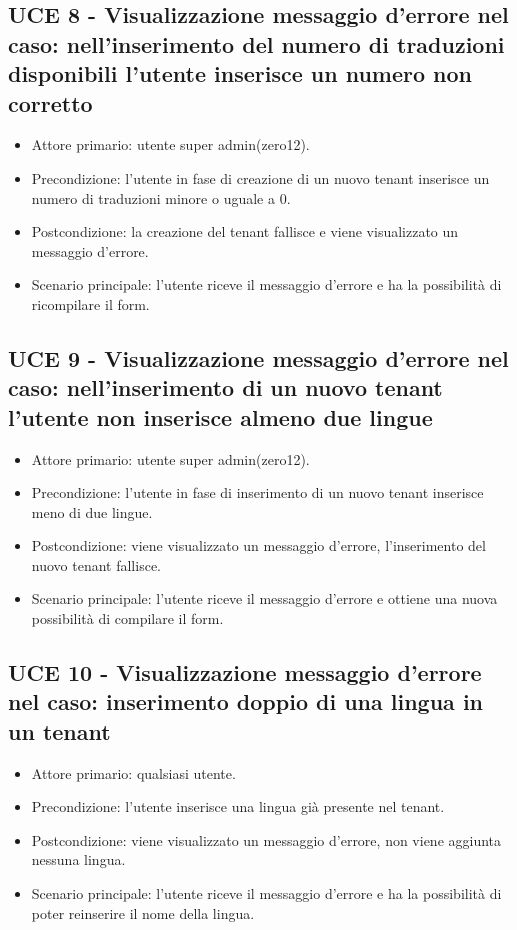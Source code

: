 \subsection{UCE 8 - Visualizzazione messaggio d'errore nel caso: nell'inserimento del numero di traduzioni disponibili l'utente inserisce un numero non corretto}
    \begin{itemize}
        \item Attore primario: utente super admin(zero12).
        \item Precondizione: l'utente in fase di creazione di un nuovo tenant inserisce un numero di traduzioni minore o uguale a 0.
        \item Postcondizione: la creazione del tenant fallisce e viene visualizzato un messaggio d'errore.
        \item Scenario principale: l'utente riceve il messaggio d'errore e ha la possibilità di ricompilare il form.
    \end{itemize}
\subsection{UCE 9 - Visualizzazione messaggio d'errore nel caso: nell'inserimento di un nuovo tenant l'utente non inserisce almeno due lingue}
    \begin{itemize}
        \item Attore primario: utente super admin(zero12).
        \item Precondizione: l'utente in fase di inserimento di un nuovo tenant inserisce meno di due lingue.
        \item Postcondizione: viene visualizzato un messaggio d'errore, l'inserimento del nuovo tenant fallisce.
        \item Scenario principale: l'utente riceve il messaggio d'errore e ottiene una nuova possibilità di compilare il form.
    \end{itemize}
\subsection{UCE 10 - Visualizzazione messaggio d'errore nel caso: inserimento doppio di una lingua in un tenant}
    \begin{itemize}
        \item Attore primario: qualsiasi utente.
        \item Precondizione: l'utente inserisce una lingua già presente nel tenant.
        \item Postcondizione: viene visualizzato un messaggio d'errore, non viene aggiunta nessuna lingua.
        \item Scenario principale: l'utente riceve il messaggio d'errore e ha la possibilità di poter reinserire il nome della lingua.
    \end{itemize}


